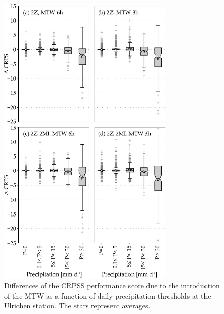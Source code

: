 \documentclass[hess, manuscript]{copernicus}
\begin{document}
	\begin{figure}[htb]
		\includegraphics[width=8.3cm]{fig10.pdf}
		\caption{Differences of the CRPSS performance score due to the introduction of the MTW as a function of daily precipitation thresholds at the Ulrichen station. The stars represent averages.}
		\label{fig:changes_CRPS_precip_threshold}
	\end{figure}
	
\end{document}
